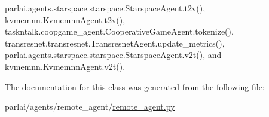 parlai.\+agents.\+starspace.\+starspace.\+Starspace\+Agent.\+t2v(), kvmemnn.\+Kvmemnn\+Agent.\+t2v(), taskntalk.\+coopgame\+\_\+agent.\+Cooperative\+Game\+Agent.\+tokenize(), transresnet.\+transresnet.\+Transresnet\+Agent.\+update\+\_\+metrics(), parlai.\+agents.\+starspace.\+starspace.\+Starspace\+Agent.\+v2t(), and kvmemnn.\+Kvmemnn\+Agent.\+v2t().



The documentation for this class was generated from the following file\+:\begin{DoxyCompactItemize}
\item 
parlai/agents/remote\+\_\+agent/\hyperlink{remote__agent_8py}{remote\+\_\+agent.\+py}\end{DoxyCompactItemize}
